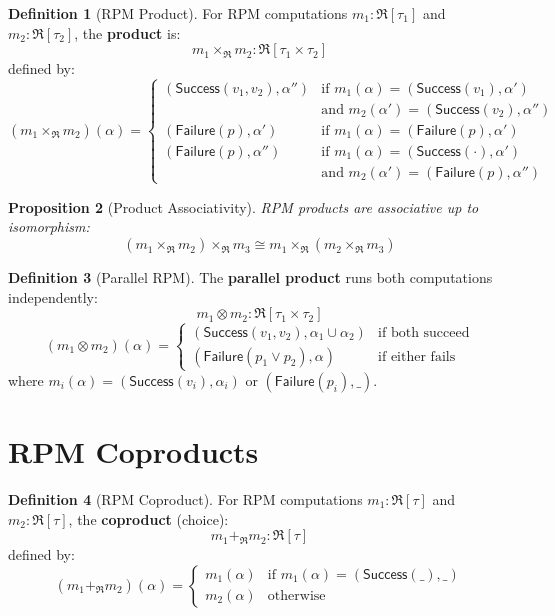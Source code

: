 \documentclass[11pt,twoside,openright]{book}
\theoremstyle{definition}
\newtheorem{definition}{Definition}[chapter]
\theoremstyle{plain}
\newtheorem{proposition}[definition]{Proposition}
\theoremstyle{remark}
\newcommand{\RPM}{\mathfrak{R}}
\begin{document}
\begin{definition}[RPM Product]
\label{def:rpm-product}
For RPM computations $m_1 : \RPM[\tau_1]$ and $m_2 : \RPM[\tau_2]$, the \textbf{product} is:
\[
m_1 \times_\RPM m_2 : \RPM[\tau_1 \times \tau_2]
\]
defined by:
\[
(m_1 \times_\RPM m_2)(\alpha) =
\begin{cases}
(\mathsf{Success}(v_1, v_2), \alpha'') & \text{if } m_1(\alpha) = (\mathsf{Success}(v_1), \alpha') \\
                                        & \text{and } m_2(\alpha') = (\mathsf{Success}(v_2), \alpha'') \\
(\mathsf{Failure}(p), \alpha') & \text{if } m_1(\alpha) = (\mathsf{Failure}(p), \alpha') \\
(\mathsf{Failure}(p), \alpha'') & \text{if } m_1(\alpha) = (\mathsf{Success}(\cdot), \alpha') \\
                                 & \text{and } m_2(\alpha') = (\mathsf{Failure}(p), \alpha'')
\end{cases}
\]
\end{definition}

\begin{proposition}[Product Associativity]
\label{prop:product-assoc}
RPM products are associative up to isomorphism:
\[
(m_1 \times_\RPM m_2) \times_\RPM m_3 \cong m_1 \times_\RPM (m_2 \times_\RPM m_3)
\]
\end{proposition}

\begin{definition}[Parallel RPM]
\label{def:parallel-rpm}
The \textbf{parallel product} runs both computations independently:
\[
m_1 \otimes m_2 : \RPM[\tau_1 \times \tau_2]
\]
\[
(m_1 \otimes m_2)(\alpha) =
\begin{cases}
(\mathsf{Success}(v_1, v_2), \alpha_1 \cup \alpha_2) & \text{if both succeed} \\
(\mathsf{Failure}(p_1 \lor p_2), \alpha) & \text{if either fails}
\end{cases}
\]
where $m_i(\alpha) = (\mathsf{Success}(v_i), \alpha_i)$ or $(\mathsf{Failure}(p_i), \_)$.
\end{definition}

\section{RPM Coproducts}

\begin{definition}[RPM Coproduct]
\label{def:rpm-coproduct}
For RPM computations $m_1 : \RPM[\tau]$ and $m_2 : \RPM[\tau]$, the \textbf{coproduct} (choice):
\[
m_1 +_\RPM m_2 : \RPM[\tau]
\]
defined by:
\[
(m_1 +_\RPM m_2)(\alpha) =
\begin{cases}
m_1(\alpha) & \text{if } m_1(\alpha) = (\mathsf{Success}(\_), \_) \\
m_2(\alpha) & \text{otherwise}
\end{cases}
\]
\end{definition}
\end{document}
